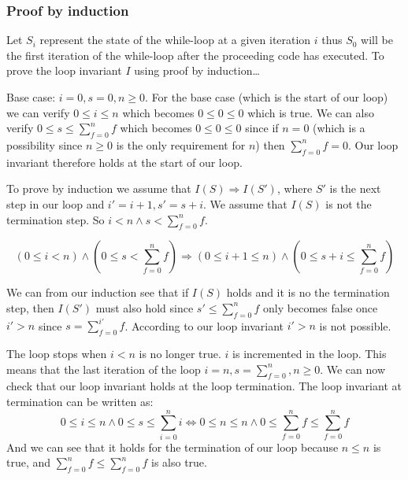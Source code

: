 \documentclass{article}
\begin{document}
\subsubsection*{Proof by induction}
Let $S_{i}$ represent the state of the while-loop at a given iteration $i$ thus $S_0$ will be the first iteration of the while-loop after the proceeding code has executed.
To prove the loop invariant $I$ using proof by induction\dots




Base case:
$i=0, s = 0, n \geq 0$.
For the base case (which is the start of our loop) we can verify $0 \leq i \leq n$ which becomes $0 \leq 0 \leq 0$ which is true. We can also verify $0 \leq s \leq \sum_{f=0}^{n}f$ which becomes $0 \leq 0 \leq 0$ since if $n=0$ (which is a possibility since $n\geq0$ is the only requirement for $n$) then $\sum_{f=0}^{n}f = 0$.
Our loop invariant therefore holds at the start of our loop.

To prove by induction we assume that $I(S) \Rightarrow I(S')$, where $S'$ is the next step in our loop and $i' = i + 1, s' = s + i$. We assume that $I(S)$ is not the termination step. So $i < n \land s < \sum_{f=0}^{n}f$.

$$(0 \leq i < n) \land (0 \leq s < \sum_{f=0}^{n}f) \Rightarrow (0 \leq i+1 \leq n) \land (0 \leq s+i \leq \sum_{f=0}^{n}f)$$

We can from our induction see that if $I(S)$ holds and it is no the termination step, then $I(S')$ must also hold since $s' \leq \sum_{f=0}^{n}f$ only becomes false once $i' > n$ since $s = \sum_{f=0}^{i'}f$. According to our loop invariant $i' > n$ is not possible.

The loop stops when $i < n$ is no longer true. $i$ is incremented in the loop. This means that the last iteration of the loop $i=n, s=\sum_{f=0}^{n}, n\geq0$.
We can now check that our loop invariant holds at the loop termination. The loop invariant at termination can be written as:
$$0 \leq i \leq n \land 0 \leq s \leq \sum_{i=0}^{n}i \iff 0 \leq n \leq n \land 0 \leq \sum_{f=0}^{n}f \leq \sum_{f=0}^{n}f$$
And we can see that it holds for the termination of our loop because $n\leq n$ is true, and $\sum_{f=0}^{n}f \leq \sum_{f=0}^{n}f$ is also true.
\end{document}

